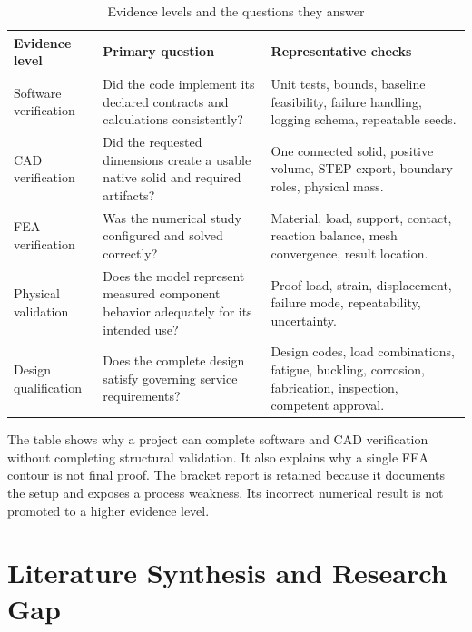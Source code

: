 \begin{table}[H]
\centering
\caption{Evidence levels and the questions they answer}
\label{tab:evidence-questions}
\begin{tabularx}{\textwidth}{p{}XX}
\toprule
\textbf{Evidence level} & \textbf{Primary question} & \textbf{Representative
checks}\\
\midrule
Software verification &
Did the code implement its declared contracts and calculations consistently? &
Unit tests, bounds, baseline feasibility, failure handling, logging schema,
repeatable seeds.\\

CAD verification &
Did the requested dimensions create a usable native solid and required
artifacts? &
One connected solid, positive volume, STEP export, boundary roles, physical
mass.\\

FEA verification &
Was the numerical study configured and solved correctly? &
Material, load, support, contact, reaction balance, mesh convergence, result
location.\\

Physical validation &
Does the model represent measured component behavior adequately for its
intended use? &
Proof load, strain, displacement, failure mode, repeatability, uncertainty.\\

Design qualification &
Does the complete design satisfy governing service requirements? &
Design codes, load combinations, fatigue, buckling, corrosion, fabrication,
inspection, competent approval.\\
\bottomrule
\end{tabularx}
\end{table}

The table shows why a project can complete software and CAD verification
without completing structural validation. It also explains why a single FEA
contour is not final proof. The bracket report is retained because it documents
the setup and exposes a process weakness. Its incorrect numerical result is
not promoted to a higher evidence level.

\section{Literature Synthesis and Research Gap}
\label{sec:literature-synthesis}

